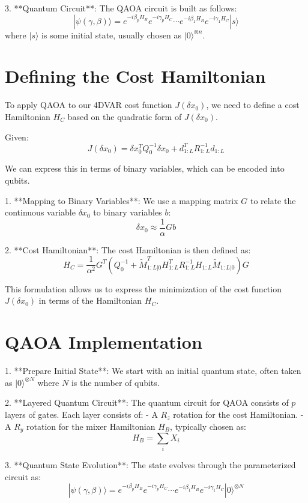 \documentclass{article}
\begin{document}
3. **Quantum Circuit**: The QAOA circuit is built as follows:
   \[
   |\psi(\gamma, \beta)\rangle = e^{-i \beta_p H_B} e^{-i \gamma_p H_C} \cdots e^{-i \beta_1 H_B} e^{-i \gamma_1 H_C} |s\rangle
   \]
   where \( |s\rangle \) is some initial state, usually chosen as \( |0\rangle^{\otimes n} \).

\section{Defining the Cost Hamiltonian}

To apply QAOA to our 4DVAR cost function \( J(\delta x_0) \), we need to define a cost Hamiltonian \( H_C \) based on the quadratic form of \( J(\delta x_0) \).

Given:
\[
J(\delta x_0) = \delta x_0^T Q_0^{-1} \delta x_0 + d_{1:L}^T R_{1:L}^{-1} d_{1:L}
\]

We can express this in terms of binary variables, which can be encoded into qubits.

1. **Mapping to Binary Variables**: We use a mapping matrix \( G \) to relate the continuous variable \( \delta x_0 \) to binary variables \( b \):
   \[
   \delta x_0 \approx \frac{1}{\alpha} G b
   \]

2. **Cost Hamiltonian**:
   The cost Hamiltonian is then defined as:
   \[
   H_C = \frac{1}{\alpha^2} G^T \left( Q_0^{-1} + \tilde{M}^T_{1:L|0} H^T_{1:L} R_{1:L}^{-1} H_{1:L} \tilde{M}_{1:L|0} \right) G
   \]

This formulation allows us to express the minimization of the cost function \( J(\delta x_0) \) in terms of the Hamiltonian \( H_C \).

\section{QAOA Implementation}

1. **Prepare Initial State**: We start with an initial quantum state, often taken as \( |0\rangle^{\otimes N} \) where \( N \) is the number of qubits.

2. **Layered Quantum Circuit**:
   The quantum circuit for QAOA consists of \( p \) layers of gates. Each layer consists of:
   - A \( R_z \) rotation for the cost Hamiltonian.
   - A \( R_y \) rotation for the mixer Hamiltonian \( H_B \), typically chosen as:
   \[
   H_B = \sum_{i} X_i
   \]

3. **Quantum State Evolution**:
   The state evolves through the parameterized circuit as:
   \[
   |\psi(\gamma, \beta)\rangle = e^{-i \beta_p H_B} e^{-i \gamma_p H_C} \cdots e^{-i \beta_1 H_B} e^{-i \gamma_1 H_C} |0\rangle^{\otimes N}
   \]
\end{document}
